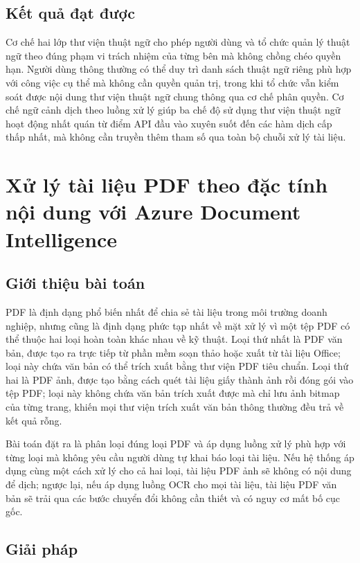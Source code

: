 \documentclass[../DoAn.tex]{subfiles}
\begin{document}
\subsection{Kết quả đạt được}

Cơ chế hai lớp thư viện thuật ngữ cho phép người dùng và tổ chức quản lý thuật ngữ theo đúng phạm vi trách nhiệm của từng bên mà không chồng chéo quyền hạn. Người dùng thông thường có thể duy trì danh sách thuật ngữ riêng phù hợp với công việc cụ thể mà không cần quyền quản trị, trong khi tổ chức vẫn kiểm soát được nội dung thư viện thuật ngữ chung thông qua cơ chế phân quyền. Cơ chế ngữ cảnh dịch theo luồng xử lý giúp ba chế độ sử dụng thư viện thuật ngữ hoạt động nhất quán từ điểm API đầu vào xuyên suốt đến các hàm dịch cấp thấp nhất, mà không cần truyền thêm tham số qua toàn bộ chuỗi xử lý tài liệu.

\section{Xử lý tài liệu PDF theo đặc tính nội dung với Azure Document Intelligence}
\label{section:5.3}

\subsection{Giới thiệu bài toán}

PDF là định dạng phổ biến nhất để chia sẻ tài liệu trong môi trường doanh nghiệp, nhưng cũng là định dạng phức tạp nhất về mặt xử lý vì một tệp PDF có thể thuộc hai loại hoàn toàn khác nhau về kỹ thuật. Loại thứ nhất là PDF văn bản, được tạo ra trực tiếp từ phần mềm soạn thảo hoặc xuất từ tài liệu Office; loại này chứa văn bản có thể trích xuất bằng thư viện PDF tiêu chuẩn. Loại thứ hai là PDF ảnh, được tạo bằng cách quét tài liệu giấy thành ảnh rồi đóng gói vào tệp PDF; loại này không chứa văn bản trích xuất được mà chỉ lưu ảnh bitmap của từng trang, khiến mọi thư viện trích xuất văn bản thông thường đều trả về kết quả rỗng.

Bài toán đặt ra là phân loại đúng loại PDF và áp dụng luồng xử lý phù hợp với từng loại mà không yêu cầu người dùng tự khai báo loại tài liệu. Nếu hệ thống áp dụng cùng một cách xử lý cho cả hai loại, tài liệu PDF ảnh sẽ không có nội dung để dịch; ngược lại, nếu áp dụng luồng OCR cho mọi tài liệu, tài liệu PDF văn bản sẽ trải qua các bước chuyển đổi không cần thiết và có nguy cơ mất bố cục gốc.

\subsection{Giải pháp}
\end{document}
